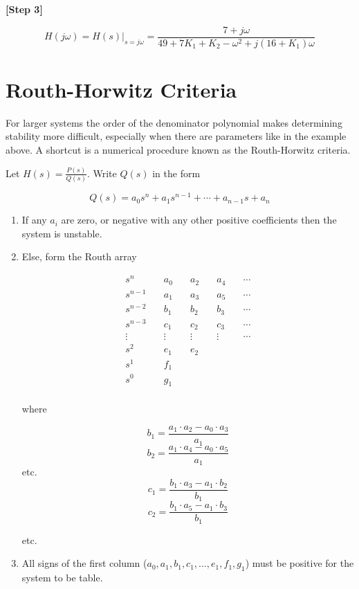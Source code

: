 \documentclass{article}
\begin{document}
\textbf{[Step 3]}

\[
H(j\omega) = \left. H(s)\right|_{s=j \omega} = \frac{7+j\omega}{49+7K_1 + K_2 - \omega^2 + j(16 + K_1)\omega}
\]

\section{Routh-Horwitz Criteria}

For larger systems the order of the denominator polynomial makes determining stability more difficult, especially when there are parameters like in the example above. A shortcut is a numerical procedure known as the Routh-Horwitz criteria.

Let $H(s) = \frac{P(s)}{Q(s)}$. Write $Q(s)$ in the form

\[
Q(s) = a_0s^n + a_1s^{n-1} + \cdots + a_{n-1}s + a_n
\]

\begin{enumerate}
\item If any $a_i$ are zero, or negative with any other positive coefficients then the system is unstable.
\item Else, form the Routh array

  \begin{align*}
    s^n &\quad a_0 &\quad a_2 &\quad a_4 &\quad \cdots\\
    s^{n-1} &\quad a_1 &\quad a_3 &\quad a_5 &\quad \cdots\\
    s^{n-2} &\quad b_1 &\quad b_2 &\quad b_3 &\quad \cdots\\
    s^{n-3} &\quad c_1 &\quad c_2 &\quad c_3 &\quad \cdots\\
    \vdots &\quad \vdots &\quad \vdots &\quad \vdots &\quad \cdots\\
    s^2 &\quad e_1 &\quad e_2 &\quad  &\quad \\
    s^1 &\quad f_1 &\quad  &\quad  &\quad \\
    s^0 &\quad g_1 &\quad  &\quad  &\quad \\
  \end{align*}

  where

  \[
  b_1 = \frac{a_1\cdot a_2 - a_0\cdot a_3}{a_1}
  \]
  \[
  b_2 = \frac{a_1\cdot a_4 - a_0\cdot a_5}{a_1}
  \]
  etc.
  \[
  c_1 = \frac{b_1\cdot a_3 - a_1\cdot b_2}{b_1}
  \]
  \[
  c_2 = \frac{b_1\cdot a_5 - a_1\cdot b_3}{b_1}
  \]

  etc.

\item All signs of the first column ($a_0, a_1, b_1, c_1,\ldots, e_1, f_1,g_1$) must be positive for the system to be table.
\end{enumerate}
\end{document}
